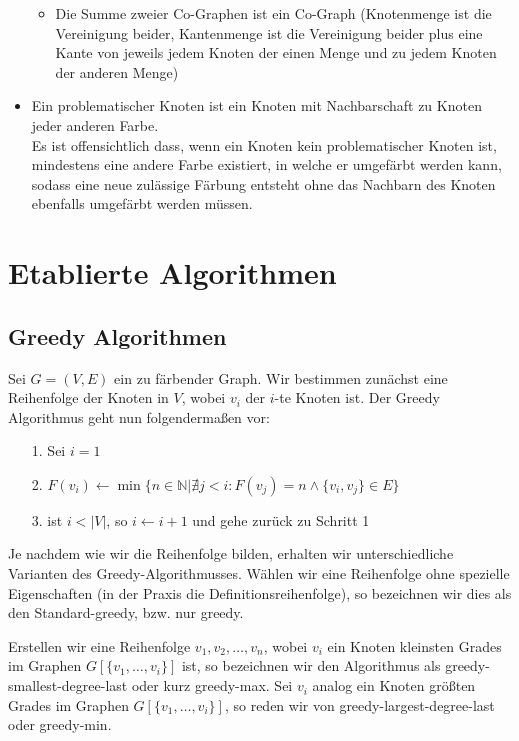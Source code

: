 \documentclass[11pt]{article}
\begin{document}
\begin{itemize}[noitemsep, left=0pt]
\begin{itemize}
  \item Die Summe zweier Co-Graphen ist ein Co-Graph (Knotenmenge ist die Vereinigung beider, Kantenmenge ist die Vereinigung beider plus eine Kante von jeweils jedem Knoten der einen Menge und zu jedem Knoten der anderen Menge)
\end{itemize}
\item Ein problematischer Knoten ist ein Knoten mit Nachbarschaft zu Knoten jeder anderen Farbe. \\
Es ist offensichtlich dass, wenn ein Knoten kein problematischer Knoten ist, mindestens eine andere Farbe existiert, in welche er umgefärbt werden kann, \\
sodass eine neue zulässige Färbung entsteht ohne das Nachbarn des Knoten ebenfalls umgefärbt werden müssen.
\end{itemize}

\section{Etablierte Algorithmen}

\subsection{Greedy Algorithmen}

Sei $G=(V,E)$ ein zu färbender Graph.
Wir bestimmen zunächst eine Reihenfolge der Knoten in $V$, wobei $v_i$ der $i$-te Knoten ist.
Der Greedy Algorithmus geht nun folgendermaßen vor:
\begin{itemize}
\item[1.] Sei $i=1$
\item[2.] $F(v_i) \leftarrow \min\{n\in\mathbb{N}|\nexists j < i: F(v_j)=n\land \{v_i, v_j\}\in E\}$
\item[3.] ist $i<|V|$, so $i\leftarrow i+1$ und gehe zurück zu Schritt 1 
\end{itemize}

Je nachdem wie wir die Reihenfolge bilden, erhalten wir unterschiedliche Varianten des Greedy-Algorithmusses.
Wählen wir eine Reihenfolge ohne spezielle Eigenschaften (in der Praxis die Definitionsreihenfolge),
so bezeichnen wir dies als den Standard-greedy, bzw. nur greedy.

Erstellen wir eine Reihenfolge $v_1,v_2,\ldots,v_n$, wobei $v_i$ ein Knoten kleinsten Grades im Graphen $G[\{v_1,\ldots,v_i\}]$ ist, so bezeichnen wir den Algorithmus als greedy-smallest-degree-last oder kurz greedy-max.
Sei $v_i$ analog ein Knoten größten Grades im Graphen $G[\{v_1,\ldots,v_i\}]$, so reden wir von greedy-largest-degree-last oder greedy-min.
\end{document}
